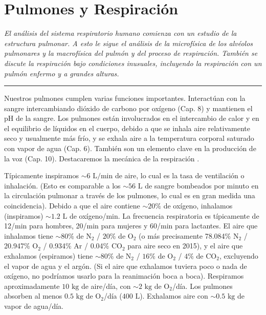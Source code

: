 \documentclass[12pt]{book}
\begin{document}
\setcounter{chapter}{8}

\chapter{Pulmones y Respiración}

\begin{flushleft}
    \textit{El análisis del sistema respiratorio humano comienza con un estudio de la estructura pulmonar. A esto le sigue el análisis de la microfísica de los alvéolos pulmonares y la macrofísica del pulmón y del proceso de respiración. También se discute la respiración bajo condiciones inusuales, incluyendo la respiración con un pulmón enfermo y a grandes alturas.}
\end{flushleft}

\hrule
\vspace{1em}

Nuestros pulmones cumplen varias funciones importantes. Interactúan con la sangre intercambiando dióxido de carbono por oxígeno (Cap. 8) y mantienen el pH de la sangre. Los pulmones están involucrados en el intercambio de calor y en el equilibrio de líquidos en el cuerpo, debido a que se inhala aire relativamente seco y usualmente más frío, y se exhala aire a la temperatura corporal saturado con vapor de agua (Cap. 6). También son un elemento clave en la producción de la voz (Cap. 10). Destacaremos la mecánica de la respiración \cite{4, 5, 10, 11, 12, 14, 22, 24, 26, 27, 34, 41, 42}.

Típicamente inspiramos $\sim 6\text{ L/min}$ de aire, lo cual es la tasa de ventilación o inhalación. (Esto es comparable a los $\sim 5\text{}6\text{ L}$ de sangre bombeados por minuto en la circulación pulmonar a través de los pulmones, lo cual es en gran medida una coincidencia). Debido a que el aire contiene $\sim 20\%$ de oxígeno, inhalamos (inspiramos) $\sim 1.2\text{ L}$ de oxígeno/min. La frecuencia respiratoria es típicamente de 12/min para hombres, 20/min para mujeres y 60/min para lactantes. El aire que inhalamos tiene $\sim 80\%$ de $\text{N}_2$ / $20\%$ de $\text{O}_2$ (o más precisamente 78.084\% $\text{N}_2$ / 20.947\% $\text{O}_2$ / 0.934\% $\text{Ar}$ / 0.04\% $\text{CO}_2$ para aire seco en 2015), y el aire que exhalamos (espiramos) tiene $\sim 80\%$ de $\text{N}_2$ / $16\%$ de $\text{O}_2$ / $4\%$ de $\text{CO}_2$, excluyendo el vapor de agua y el argón. (Si el aire que exhalamos tuviera poco o nada de oxígeno, no podríamos usarlo para la reanimación boca a boca). Respiramos aproximadamente $10\text{ kg}$ de aire/día, con $\sim 2\text{ kg}$ de $\text{O}_2$/día. Los pulmones absorben al menos $0.5\text{ kg}$ de $\text{O}_2$/día ($400\text{ L}$). Exhalamos aire con $\sim 0.5\text{ kg}$ de vapor de agua/día.
\end{document}
